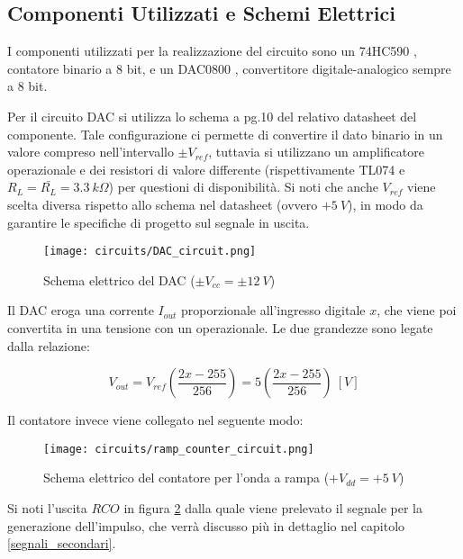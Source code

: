 \subsection*{Componenti Utilizzati e Schemi Elettrici}


I componenti utilizzati per la realizzazione del circuito sono un 74HC590 \cite{74hc590},
contatore binario a 8 bit, e un DAC0800 \cite{dac0800}, convertitore digitale-analogico sempre
a 8 bit.

Per il circuito DAC si utilizza lo schema a pg.10 del relativo datasheet del componente.
Tale configurazione ci permette di convertire il dato binario in un valore compreso
nell'intervallo $\pm V_{ref}$, tuttavia si utilizzano un amplificatore operazionale e dei
resistori di valore differente (rispettivamente TL074 \cite{tl074} e $R_L=\bar{R_L}=3.3\ k\Omega$)
per questioni di disponibilità. Si noti che anche $V_{ref}$ viene scelta diversa rispetto
allo schema nel datasheet (ovvero $+5\ V$), in modo da garantire le specifiche di progetto
sul segnale in uscita.

\begin{figure}[H]
    \centering
    \texttt{[image: circuits/DAC\_circuit.png]}
    \caption{Schema elettrico del DAC ($\pm V_{cc}=\pm 12\ V$)}
    \label{DAC_circuit}
\end{figure}

Il DAC eroga una corrente $I_{out}$ proporzionale all'ingresso digitale $x$, che viene poi
convertita in una tensione con un operazionale. Le due grandezze sono legate dalla relazione:

\begin{equation}\label{vout_dac}
    V_{out}=V_{ref}\left(\frac{2x-255}{256}\right)=5\left(\frac{2x-255}{256}\right)\ [V]
\end{equation}

Il contatore invece viene collegato nel seguente modo:

\begin{figure}[H]
    \centering
    \texttt{[image: circuits/ramp\_counter\_circuit.png]}
    \caption{Schema elettrico del contatore per l'onda a rampa ($+V_{dd}=+5\ V$)}
    \label{ramp_counter_circuit}
\end{figure}

Si noti l'uscita $RCO$ in figura \ref{ramp_counter_circuit} dalla quale viene prelevato
il segnale per la generazione dell'impulso, che verrà discusso più in dettaglio nel capitolo
\ref{segnali_secondari}.

